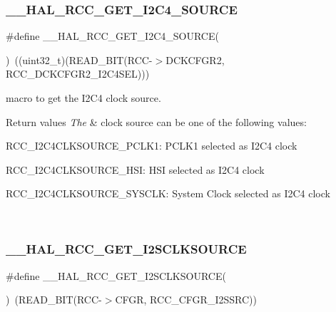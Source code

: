 \subsubsection{\texorpdfstring{\_\_HAL\_RCC\_GET\_I2C4\_SOURCE}{\_\_HAL\_RCC\_GET\_I2C4\_SOURCE}}
{\footnotesize\ttfamily \#define \+\_\+\+\_\+\+H\+A\+L\+\_\+\+R\+C\+C\+\_\+\+G\+E\+T\+\_\+\+I2\+C4\+\_\+\+S\+O\+U\+R\+CE(\begin{DoxyParamCaption}{ }\end{DoxyParamCaption})~((uint32\+\_\+t)(R\+E\+A\+D\+\_\+\+B\+IT(R\+CC-\/$>$D\+C\+K\+C\+F\+G\+R2, R\+C\+C\+\_\+\+D\+C\+K\+C\+F\+G\+R2\+\_\+\+I2\+C4\+S\+EL)))}



macro to get the I2\+C4 clock source. 


\begin{DoxyRetVals}{Return values}
{\em The} & clock source can be one of the following values\+: \begin{DoxyItemize}
\item R\+C\+C\+\_\+\+I2\+C4\+C\+L\+K\+S\+O\+U\+R\+C\+E\+\_\+\+P\+C\+L\+K1\+: P\+C\+L\+K1 selected as I2\+C4 clock \item R\+C\+C\+\_\+\+I2\+C4\+C\+L\+K\+S\+O\+U\+R\+C\+E\+\_\+\+H\+SI\+: H\+SI selected as I2\+C4 clock \item R\+C\+C\+\_\+\+I2\+C4\+C\+L\+K\+S\+O\+U\+R\+C\+E\+\_\+\+S\+Y\+S\+C\+LK\+: System Clock selected as I2\+C4 clock \end{DoxyItemize}
\\
\hline
\end{DoxyRetVals}
\mbox{\label{group___r_c_c_ex___exported___macros_ga4a027bee91b86bd6c280265c43624fc6}} 
\subsubsection{\texorpdfstring{\_\_HAL\_RCC\_GET\_I2SCLKSOURCE}{\_\_HAL\_RCC\_GET\_I2SCLKSOURCE}}
{\footnotesize\ttfamily \#define \+\_\+\+\_\+\+H\+A\+L\+\_\+\+R\+C\+C\+\_\+\+G\+E\+T\+\_\+\+I2\+S\+C\+L\+K\+S\+O\+U\+R\+CE(\begin{DoxyParamCaption}{ }\end{DoxyParamCaption})~(R\+E\+A\+D\+\_\+\+B\+IT(R\+CC-\/$>$C\+F\+GR, R\+C\+C\+\_\+\+C\+F\+G\+R\+\_\+\+I2\+S\+S\+RC))}



